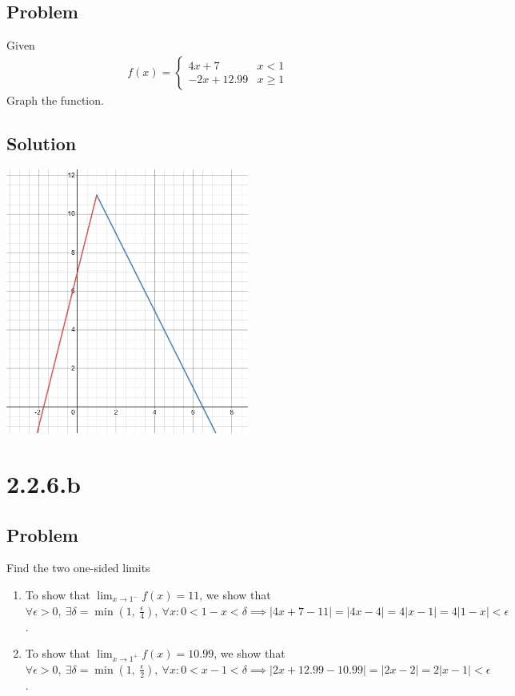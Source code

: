 \documentclass[12pt]{article}
\newcommand{\round}[1]{\left(       #1 \right)      }
\newcommand{\abs}  [1]{\left|       #1 \right|      }
\begin{document}
\subsection*{Problem}
Given
\begin{align*}
    f(x) = \begin{cases}
        4x + 7 & x < 1 \\
        -2x + 12.99 & x \geq 1
    \end{cases}
\end{align*}
Graph the function.

\subsection*{Solution}
\begin{center}
\includegraphics[width=8cm]{2.2.6}
\end{center}



\section*{2.2.6.b}

\subsection*{Problem}
Find the two one-sided limits

\begin{enumerate}
    \item To show that $\lim_{x \to 1^{-}} f(x) = 11$, we show that $\forall \epsilon > 0,\ \exists \delta = \min\round{1,\ \frac{\epsilon}{4}},\ \forall x : 0 < 1 - x < \delta \implies \abs{4x + 7 - 11} = \abs{4x - 4} = 4\abs{x - 1} = 4 \abs{1 - x} < \epsilon$.
    \item To show that $\lim_{x \to 1^{+}} f(x) = 10.99$, we show that $\forall \epsilon > 0,\ \exists \delta = \min\round{1,\ \frac{\epsilon}{2}},\ \forall x : 0 < x - 1 < \delta \implies \abs{2x + 12.99 - 10.99} = \abs{2x - 2} = 2\abs{x - 1} < \epsilon$.
\end{enumerate}
\end{document}
